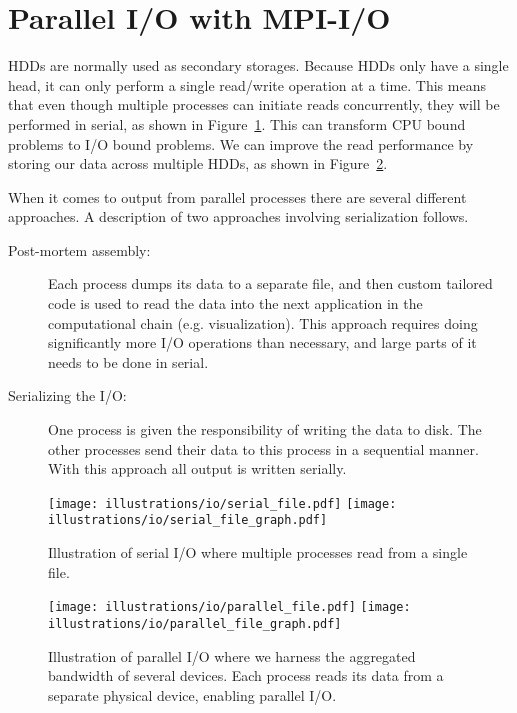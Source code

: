 
\section{Parallel I/O with MPI-I/O} %
\label{sec:parallel_i_o_with_mpi_i_o}
HDDs are normally used as secondary storages. Because HDDs only have a single head, it can only perform a single read/write operation at a time. This means that even though multiple processes can initiate reads concurrently, they will be performed in serial, as shown in Figure~\ref{fig:io_serial}. This can transform CPU bound problems to I/O bound problems.  We can improve the read performance by storing our data across multiple HDDs, as shown in Figure~\ref{fig:io_parallel}.

When it comes to output from parallel processes there are several different approaches. A description of two approaches involving serialization follows.
\begin{description}
  \item[Post-mortem assembly:] Each process dumps its data to a separate file, and then custom tailored code is used to read the data into the next application in the computational chain (e.g. visualization). This approach requires doing significantly more I/O operations than necessary, and large parts of it needs to be done in serial.
  \item[Serializing the I/O:] One process is given the responsibility of writing the data to disk. The other processes send their data to this process in a sequential manner. With this approach all output is written serially.
\end{description}


\begin{figure}[htbp]
  \centering
  \texttt{[image: illustrations/io/serial\_file.pdf]}
  \texttt{[image: illustrations/io/serial\_file\_graph.pdf]}
  \caption{Illustration of serial I/O where multiple processes read from a single file.}
  \label{fig:io_serial}
\end{figure}

\begin{figure}[htbp]
  \centering
  \texttt{[image: illustrations/io/parallel\_file.pdf]}
  \texttt{[image: illustrations/io/parallel\_file\_graph.pdf]}
  \caption{Illustration of parallel I/O where we harness the aggregated bandwidth of several devices. Each process reads its data from a separate physical device, enabling parallel I/O.}
  \label{fig:io_parallel}
\end{figure}

